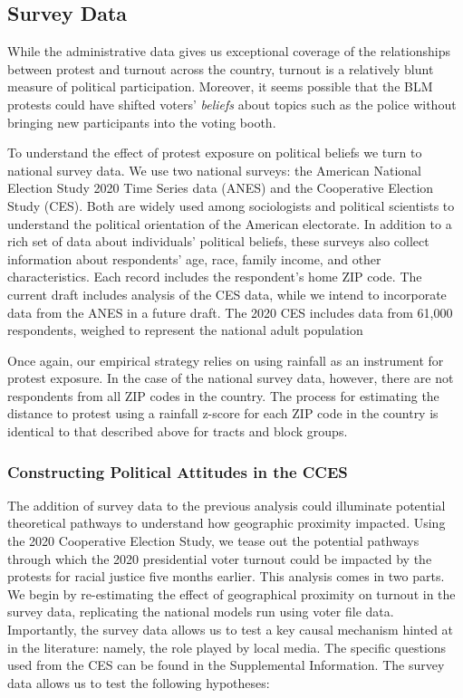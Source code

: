 \documentclass[
  12pt,
]{article}
\begin{document}
\hypertarget{survey-data}{%
\subsection*{Survey Data}\label{survey-data}}

While the administrative data gives us exceptional coverage of the relationships between protest and turnout across the country, turnout is a relatively blunt measure of political participation. Moreover, it seems possible that the BLM protests could have shifted voters' \emph{beliefs} about topics such as the police without bringing new participants into the voting booth.

To understand the effect of protest exposure on political beliefs we turn to national survey data. We use two national surveys: the American National Election Study 2020 Time Series data (ANES) and the Cooperative Election Study (CES). Both are widely used among sociologists and political scientists to understand the political orientation of the American electorate. In addition to a rich set of data about individuals' political beliefs, these surveys also collect information about respondents' age, race, family income, and other characteristics. Each record includes the respondent's home ZIP code. The current draft includes analysis of the CES data, while we intend to incorporate data from the ANES in a future draft. The 2020 CES includes data from 61,000 respondents, weighed to represent the national adult population

Once again, our empirical strategy relies on using rainfall as an instrument for protest exposure. In the case of the national survey data, however, there are not respondents from all ZIP codes in the country. The process for estimating the distance to protest using a rainfall z-score for each ZIP code in the country is identical to that described above for tracts and block groups.

\hypertarget{constructing-political-attitudes-in-the-cces}{%
\subsubsection*{Constructing Political Attitudes in the CCES}\label{constructing-political-attitudes-in-the-cces}}

The addition of survey data to the previous analysis could illuminate potential theoretical pathways to understand how geographic proximity impacted. Using the 2020 Cooperative Election Study, we tease out the potential pathways through which the 2020 presidential voter turnout could be impacted by the protests for racial justice five months earlier. This analysis comes in two parts. We begin by re-estimating the effect of geographical proximity on turnout in the survey data, replicating the national models run using voter file data. Importantly, the survey data allows us to test a key causal mechanism hinted at in the literature: namely, the role played by local media. The specific questions used from the CES can be found in the Supplemental Information. The survey data allows us to test the following hypotheses:
\end{document}

